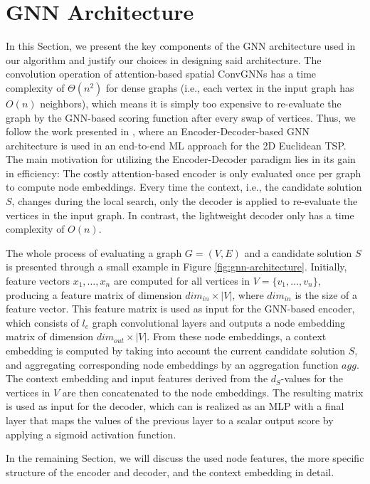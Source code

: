\documentclass[draft,final]{vutinfth} %
\begin{document}
\section{GNN Architecture}\label{sec:gnn-architecture}
In this Section, we present the key components of the GNN architecture used in our algorithm and justify our choices in designing said architecture. 
The convolution operation of attention-based spatial ConvGNNs has a time complexity of $\Theta(n^2)$ for dense graphs (i.e., each vertex in the input graph has $O(n)$ neighbors), which means it is simply too expensive to re-evaluate the graph by the GNN-based scoring function after every swap of vertices. 
Thus, we follow the work presented in \cite{Kool2019}, where an Encoder-Decoder-based GNN architecture is used in an end-to-end ML approach for the 2D Euclidean TSP. 
The main motivation for utilizing the Encoder-Decoder paradigm lies in its gain in efficiency: The costly attention-based encoder is only evaluated once per graph to compute node embeddings. Every time the context, i.e., the candidate solution $S$, changes during the local search, only the decoder is applied to re-evaluate the vertices in the input graph. In contrast, the lightweight decoder only has a time complexity of $O(n)$. 

The whole process of evaluating a graph $G = (V, E)$ and a candidate solution $S$ is presented through a small example in Figure \ref{fig:gnn-architecture}. 
Initially, feature vectors $x_1, \dots, x_n$ are computed for all vertices in $V = \{v_1, \dots, v_n\}$, producing a feature matrix of dimension $\mathit{dim_{in}} \times |V|$, where $\mathit{dim_{in}}$ is the size of a feature vector. This feature matrix is used as input for the GNN-based encoder, which consists of $l_e$ graph convolutional layers and outputs a node embedding matrix of dimension $\mathit{dim_{out}} \times |V|$. From these node embeddings, a context embedding is computed by taking into account the current candidate solution $S$, and aggregating corresponding node embeddings by an aggregation function $\mathit{agg}$. The context embedding and input features derived from the $d_S$-values for the vertices in $V$ are then concatenated to the node embeddings. The resulting matrix is used as input for the decoder, which can is realized as an MLP with a final layer that maps the values of the previous layer to a scalar output score by applying a sigmoid activation function. 

In the remaining Section, we will discuss the used node features, the more specific structure of the encoder and decoder, and the context embedding in detail. 
\end{document}
